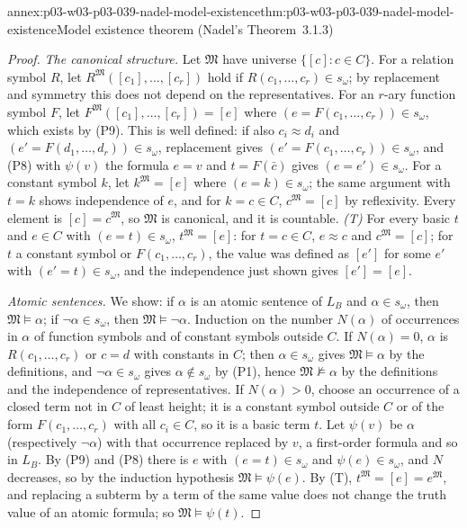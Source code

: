 \begin{annexitem}{annex:p03-w03-p03-039-nadel-model-existence}{thm:p03-w03-p03-039-nadel-model-existence}{Model existence theorem (Nadel's Theorem~3.1.3)}
\begin{proof}
\emph{The canonical structure.} Let \(\mathfrak M\) have universe
\(\{[c]:c\in C\}\). For a relation symbol \(R\), let
\(R^{\mathfrak M}([c_1],\dots,[c_r])\) hold if \(R(c_1,\dots,c_r)\in s_\omega\);
by replacement and symmetry this does not depend on the representatives. For
an \(r\)-ary function symbol \(F\), let
\(F^{\mathfrak M}([c_1],\dots,[c_r])=[e]\) where \((e=F(c_1,\dots,c_r))\in s_\omega\),
which exists by (P9). This is well defined: if also \(c_i\approx d_i\) and
\((e'=F(d_1,\dots,d_r))\in s_\omega\), replacement gives
\((e'=F(c_1,\dots,c_r))\in s_\omega\), and (P8) with \(\psi(v)\) the formula
\(e=v\) and \(t=F(\bar c)\) gives \((e=e')\in s_\omega\). For a constant symbol
\(k\), let \(k^{\mathfrak M}=[e]\) where \((e=k)\in s_\omega\); the same
argument with \(t=k\) shows independence of \(e\), and for \(k=c\in C\),
\(c^{\mathfrak M}=[c]\) by reflexivity. Every element is \([c]=c^{\mathfrak M}\),
so \(\mathfrak M\) is canonical, and it is countable.
\emph{(T)} For every basic \(t\) and \(e\in C\) with \((e=t)\in s_\omega\),
\(t^{\mathfrak M}=[e]\): for \(t=c\in C\), \(e\approx c\) and
\(c^{\mathfrak M}=[c]\); for \(t\) a constant symbol or \(F(c_1,\dots,c_r)\),
the value was defined as \([e']\) for some \(e'\) with \((e'=t)\in s_\omega\),
and the independence just shown gives \([e']=[e]\).

\emph{Atomic sentences.} We show: if \(\alpha\) is an atomic sentence of
\(L_B\) and \(\alpha\in s_\omega\), then \(\mathfrak M\models\alpha\); if
\(\neg\alpha\in s_\omega\), then \(\mathfrak M\models\neg\alpha\). Induction on
the number \(N(\alpha)\) of occurrences in \(\alpha\) of function symbols and of
constant symbols outside \(C\). If \(N(\alpha)=0\), \(\alpha\) is
\(R(c_1,\dots,c_r)\) or \(c=d\) with constants in \(C\); then
\(\alpha\in s_\omega\) gives \(\mathfrak M\models\alpha\) by the definitions,
and \(\neg\alpha\in s_\omega\) gives \(\alpha\notin s_\omega\) by (P1), hence
\(\mathfrak M\not\models\alpha\) by the definitions and the independence of
representatives. If \(N(\alpha)>0\), choose an occurrence of a closed term
not in \(C\) of least height; it is a constant symbol outside \(C\) or of
the form \(F(c_1,\dots,c_r)\) with all \(c_i\in C\), so it is a basic term
\(t\). Let \(\psi(v)\) be \(\alpha\) (respectively \(\neg\alpha\)) with that
occurrence replaced by \(v\), a first-order formula and so in \(L_B\). By
(P9) and (P8) there is \(e\) with \((e=t)\in s_\omega\) and
\(\psi(e)\in s_\omega\), and \(N\) decreases, so by the induction hypothesis
\(\mathfrak M\models\psi(e)\). By (T), \(t^{\mathfrak M}=[e]=e^{\mathfrak M}\),
and replacing a subterm by a term of the same value does not change the
truth value of an atomic formula; so \(\mathfrak M\models\psi(t)\).


\end{proof}
\end{annexitem}
